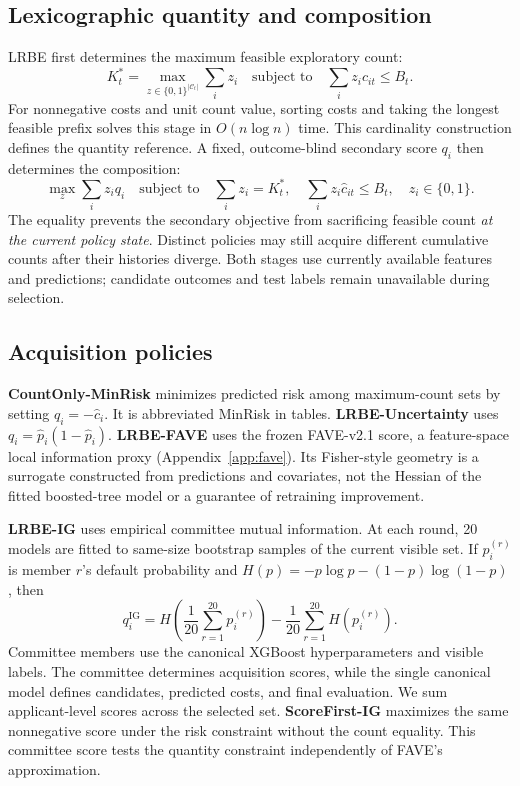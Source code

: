 \subsection{Lexicographic quantity and composition}
LRBE first determines the maximum feasible exploratory count:
\begin{equation}
K_t^*=\max_{z\in\{0,1\}^{|\mathcal C_t|}}\sum_i z_i
\quad\text{subject to}\quad \sum_i z_i\widehat c_{it}\le B_t.
\label{eq:kstar}
\end{equation}
For nonnegative costs and unit count value, sorting costs and taking the longest feasible prefix solves this stage in $O(n\log n)$ time. This cardinality construction defines the quantity reference. A fixed, outcome-blind secondary score $q_i$ then determines the composition:
\begin{equation}
\max_z\sum_i z_iq_i
\quad\text{subject to}\quad \sum_i z_i=K_t^*,\quad
\sum_i z_i\widehat c_{it}\le B_t,\quad z_i\in\{0,1\}.
\label{eq:stage2}
\end{equation}
The equality prevents the secondary objective from sacrificing feasible count \emph{at the current policy state}. Distinct policies may still acquire different cumulative counts after their histories diverge. Both stages use currently available features and predictions; candidate outcomes and test labels remain unavailable during selection.

\subsection{Acquisition policies}
\textbf{CountOnly-MinRisk} minimizes predicted risk among maximum-count sets by setting $q_i=-\widehat c_i$. It is abbreviated MinRisk in tables. \textbf{LRBE-Uncertainty} uses $q_i=\widehat p_i(1-\widehat p_i)$. \textbf{LRBE-FAVE} uses the frozen FAVE-v2.1 score, a feature-space local information proxy (Appendix~\ref{app:fave}). Its Fisher-style geometry is a surrogate constructed from predictions and covariates, not the Hessian of the fitted boosted-tree model or a guarantee of retraining improvement.

\textbf{LRBE-IG} uses empirical committee mutual information. At each round, 20 models are fitted to same-size bootstrap samples of the current visible set. If $p_i^{(r)}$ is member $r$'s default probability and $H(p)=-p\log p-(1-p)\log(1-p)$, then
\begin{equation}
q_i^{\mathrm{IG}}=H\!\left(\frac{1}{20}\sum_{r=1}^{20}p_i^{(r)}\right)-\frac{1}{20}\sum_{r=1}^{20}H\!\left(p_i^{(r)}\right).
\label{eq:ig}
\end{equation}
Committee members use the canonical XGBoost hyperparameters and visible labels. The committee determines acquisition scores, while the single canonical model defines candidates, predicted costs, and final evaluation. We sum applicant-level scores across the selected set. \textbf{ScoreFirst-IG} maximizes the same nonnegative score under the risk constraint without the count equality. This committee score tests the quantity constraint independently of FAVE's approximation.

